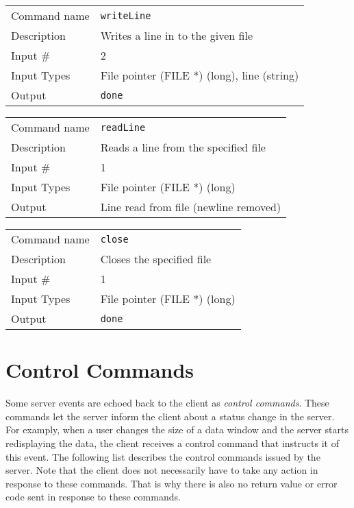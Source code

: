 \bigskip

\noindent
\begin{tabular}{l|p{5in}}
\hline
Command name & {\tt writeLine} \\
Description  & Writes a line in to the given file \\
Input \#     & 2 \\
Input Types  & File pointer (FILE *) (long), line (string) \\
Output       & {\tt done} \\
\hline
\end{tabular}

\bigskip

\noindent
\begin{tabular}{l|p{5in}}
\hline
Command name & {\tt readLine} \\
Description  & Reads a line from the specified file \\
Input \#     & 1 \\
Input Types  & File pointer (FILE *) (long) \\
Output       & Line read from file (newline removed) \\
\hline
\end{tabular}

\bigskip

\noindent
\begin{tabular}{l|p{5in}}
\hline
Command name & {\tt close} \\
Description  & Closes the specified file \\
Input \#     & 1 \\
Input Types  & File pointer (FILE *) (long) \\
Output       & {\tt done} \\
\hline
\end{tabular}

\section{Control Commands}

Some server events are echoed back to the client as {\em control
commands}. These commands let the server inform the client about a
status change in the server.  For examply, when a user changes the
size of a data window and the server starts redisplaying the data, the
client receives a control command that instructs it of this event. The
following list describes the control commands issued by the
server. Note that the client does not necessarily have to take any
action in response to these commands. That is why there is also no
return value or error code sent in response to these commands.

